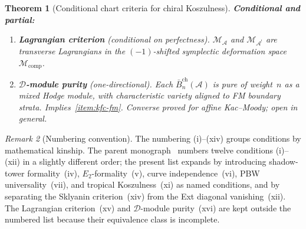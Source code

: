 \documentclass[11pt,reqno]{amsart}
\newtheorem{theorem}{Theorem}[section]
\theoremstyle{definition}
\theoremstyle{remark}
\newtheorem{remark}[theorem]{Remark}
\newcommand{\cA}{\mathcal{A}}
\newcommand{\cD}{\mathcal{D}}
\newcommand{\cM}{\mathcal{M}}
\newcommand{\barBch}{\bar{B}^{\mathrm{ch}}}
\newcommand{\Etwo}{E_2}
\numberwithin{equation}{section}
\begin{document}
\begin{theorem}[Conditional chart criteria for chiral Koszulness]
\medskip
\noindent
\textbf{Conditional and partial:}
\begin{enumerate}[label=\textup{(\roman*)},leftmargin=2.4em,start=15]

\item\label{item:kfc-lagrangian}
\textbf{Lagrangian criterion} \textup{(conditional on
perfectness).}
$\cM_\cA$ and $\cM_{\cA^!}$ are transverse Lagrangians in the
$(-1)$-shifted symplectic deformation space~$\cM_{\mathrm{comp}}$.

\item\label{item:kfc-purity}
\textbf{$\cD$-module purity} \textup{(one-directional).}
Each $\barBch_n(\cA)$ is pure of weight~$n$ as a mixed Hodge
module, with characteristic variety aligned to FM boundary strata.
Implies~\textup{\ref{item:kfc-fm}}. Converse proved for affine
Kac--Moody; open in general.

\end{enumerate}
\end{theorem}

\begin{remark}[Numbering convention]
\label{rem:kfc-numbering}
The numbering (i)--(xiv) groups conditions by
mathematical kinship.
The parent monograph~\cite{LorgatMKD1} numbers twelve
conditions (i)--(xii) in a slightly different order; the
present list expands by introducing shadow-tower
formality~(iv), $\Etwo$-formality~(v), curve
independence~(vi), PBW universality~(vii), and tropical
Koszulness~(xi) as named conditions, and by separating the
Sklyanin criterion~(xiv) from the Ext diagonal
vanishing~(xii).
The Lagrangian criterion~(xv) and $\cD$-module purity~(xvi)
are kept outside the numbered list because their equivalence
class is incomplete.
\end{remark}
\end{document}
